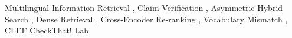 \documentclass{ceurart}
\begin{document}
\begin{keywords}
  Multilingual Information Retrieval \sep
  Claim Verification \sep
  Asymmetric Hybrid Search \sep
  Dense Retrieval \sep
  Cross-Encoder Re-ranking \sep
  Vocabulary Mismatch \sep
  CLEF CheckThat! Lab
\end{keywords}
\maketitle















%


\end{document}
